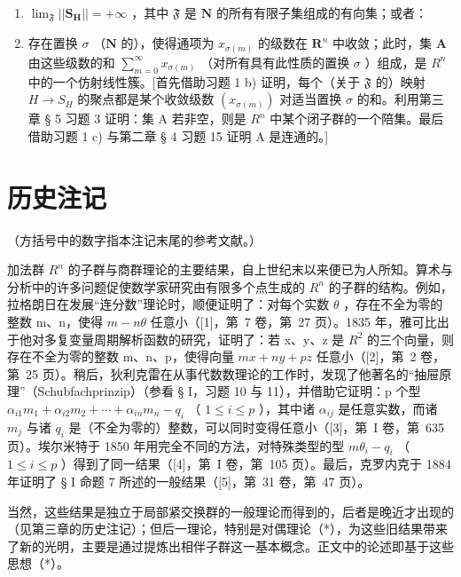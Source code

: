 \begin{enumerate}
\def\labelenumi{(\roman{enumi})}
\item
  \(\lim_{\mathfrak{F}}||\mathbf{S}_{\mathbf{H}}|| = +\infty\) ，其中 \(\mathfrak{F}\) 是 \(\mathbf{N}\) 的所有有限子集组成的有向集；或者：
\item
  存在置换 \(\sigma\) （\(\mathbf{N}\) 的），使得通项为 \(x_{\sigma(m)}\) 的级数在 \(\mathbf{R}^n\) 中收敛；此时，集 \(\mathbf{A}\) 由这些级数的和 \(\sum_{m=0}^{\infty} x_{\sigma(m)}\) （对所有具有此性质的置换 \(\sigma\) ）组成，是 \(R^n\) 中的一个仿射线性簇。{[}首先借助习题 1 b) 证明，每个（关于 \(\mathfrak{F}\) 的）映射 \(H \to S_H\) 的聚点都是某个收敛级数 \((x_{\sigma(m)})\) 对适当置换 \(\sigma\) 的和。利用第三章 § 5 习题 3 证明：集 A 若非空，则是 \(R^n\) 中某个闭子群的一个陪集。最后借助习题 1 c) 与第二章 § 4 习题 15 证明 A 是连通的。{]}
\end{enumerate}

\section*{历史注记}
{}

（方括号中的数字指本注记末尾的参考文献。）

加法群 \(R^{n}\) 的子群与商群理论的主要结果，自上世纪末以来便已为人所知。算术与分析中的许多问题促使数学家研究由有限多个点生成的 \(R^{n}\) 的子群的结构。例如，拉格朗日在发展“连分数”理论时，顺便证明了：对每个实数 \(\theta\) ，存在不全为零的整数 m、n，使得 \(m - n\theta\) 任意小（{[}1{]}，第~7 卷，第~27 页）。1835 年，雅可比出于他对多复变量周期解析函数的研究，证明了：若 x、y、z 是 \(R^{2}\) 的三个向量，则存在不全为零的整数 m、n、p，使得向量 \(mx + ny + pz\) 任意小（{[}2{]}，第~2 卷，第~25 页）。稍后，狄利克雷在从事代数数理论的工作时，发现了他著名的“抽屉原理”（Schubfachprinzip）（参看 § I，习题 10 与 11），并借助它证明：p 个型 \(\alpha_{i1}m_{1} + \alpha_{i2}m_{2} + \cdots + \alpha_{in}m_{n} - q_{i}\) （ \(1 \leqslant i \leqslant p\) ），其中诸 \(\alpha_{ij}\) 是任意实数，而诸 \(m_{j}\) 与诸 \(q_{i}\) 是（不全为零的）整数，可以同时变得任意小（{[}3{]}，第~I 卷，第~635 页）。埃尔米特于 1850 年用完全不同的方法，对特殊类型的型 \(m\theta_{i} - q_{i}\) （ \(1 \leqslant i \leqslant p\) ）得到了同一结果（{[}4{]}，第~I 卷，第~105 页）。最后，克罗内克于 1884 年证明了 § I 命题 7 所述的一般结果（{[}5{]}，第~31 卷，第~47 页）。

当然，这些结果是独立于局部紧交换群的一般理论而得到的，后者是晚近才出现的（见第三章的历史注记）；但后一理论，特别是对偶理论（*），为这些旧结果带来了新的光明，主要是通过提炼出相伴子群这一基本概念。正文中的论述即基于这些思想（*）。


